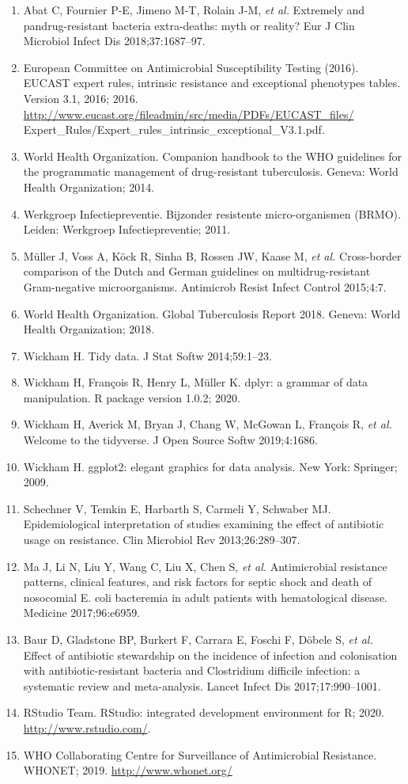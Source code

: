 \documentclass[
]{book}
\begin{document}
\begin{enumerate}
\item
  Abat C, Fournier P-E, Jimeno M-T, Rolain J-M, \emph{et al.} Extremely and pandrug-resistant bacteria extra-deaths: myth or reality? Eur J Clin Microbiol Infect Dis 2018;37:1687--97.
\item
  European Committee on Antimicrobial Susceptibility Testing (2016). EUCAST expert rules, intrinsic resistance and exceptional phenotypes tables. Version 3.1, 2016; 2016. \url{http://www.eucast.org/fileadmin/src/media/PDFs/EUCAST_files/} Expert\_Rules/Expert\_rules\_intrinsic\_exceptional\_V3.1.pdf.
\item
  World Health Organization. Companion handbook to the WHO guidelines for the programmatic management of drug-resistant tuberculosis. Geneva: World Health Organization; 2014.
\item
  Werkgroep Infectiepreventie. Bijzonder resistente micro-organismen (BRMO). Leiden: Werkgroep Infectiepreventie; 2011.
\item
  Müller J, Voss A, Köck R, Sinha B, Rossen JW, Kaase M, \emph{et al.} Cross-border comparison of the Dutch and German guidelines on multidrug-resistant Gram-negative microorganisms. Antimicrob Resist Infect Control 2015;4:7.
\item
  World Health Organization. Global Tuberculosis Report 2018. Geneva: World Health Organization; 2018.
\item
  Wickham H. Tidy data. J Stat Softw 2014;59:1--23.
\item
  Wickham H, François R, Henry L, Müller K. dplyr: a grammar of data manipulation. R package version 1.0.2; 2020.
\item
  Wickham H, Averick M, Bryan J, Chang W, McGowan L, François R, \emph{et al.} Welcome to the tidyverse. J Open Source Softw 2019;4:1686.
\item
  Wickham H. ggplot2: elegant graphics for data analysis. New York: Springer; 2009.
\item
  Schechner V, Temkin E, Harbarth S, Carmeli Y, Schwaber MJ. Epidemiological interpretation of studies examining the effect of antibiotic usage on resistance. Clin Microbiol Rev 2013;26:289--307.
\item
  Ma J, Li N, Liu Y, Wang C, Liu X, Chen S, \emph{et al.} Antimicrobial resistance patterns, clinical features, and risk factors for septic shock and death of nosocomial E. coli bacteremia in adult patients with hematological disease. Medicine 2017;96:e6959.
\item
  Baur D, Gladstone BP, Burkert F, Carrara E, Foschi F, Döbele S, \emph{et al.} Effect of antibiotic stewardship on the incidence of infection and colonisation with antibiotic-resistant bacteria and Clostridium difficile infection: a systematic review and meta-analysis. Lancet Infect Dis 2017;17:990--1001.
\item
  RStudio Team. RStudio: integrated development environment for R; 2020. \url{http://www.rstudio.com/}.
\item
  WHO Collaborating Centre for Surveillance of Antimicrobial Resistance. WHONET; 2019. \url{http://www.whonet.org/}
\end{enumerate}
\end{document}
